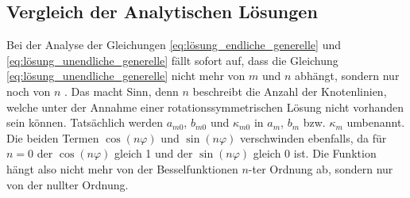 \subsection{Vergleich der Analytischen Lösungen
\label{kreismembran:vergleich}}
Bei der Analyse der Gleichungen \eqref{eq:lösung_endliche_generelle} und \eqref{eq:lösung_unendliche_generelle} fällt sofort auf, dass die Gleichung \eqref{eq:lösung_unendliche_generelle} nicht mehr von $m$ und $n$ abhängt, sondern nur noch von $n$ \cite{nishanth_p_vibrations_2018}. 
Das macht Sinn, denn $n$ beschreibt die Anzahl der Knotenlinien, welche unter der Annahme einer rotationssymmetrischen Lösung nicht vorhanden sein können. Tatsächlich werden $a_{m0}$, $b_{m0}$ und $\kappa_{m0}$ in $a_m$, $b_m$ bzw. $\kappa_m$ umbenannt. Die beiden Termen $\cos(n\varphi)$ und $\sin(n\varphi)$ verschwinden ebenfalls, da für $n=0$ der $\cos(n\varphi)$ gleich 1 und der $\sin(n \varphi)$ gleich 0 ist.
Die Funktion hängt also nicht mehr von der Besselfunktionen $n$-ter Ordnung ab, sondern nur von der nullter Ordnung. 


